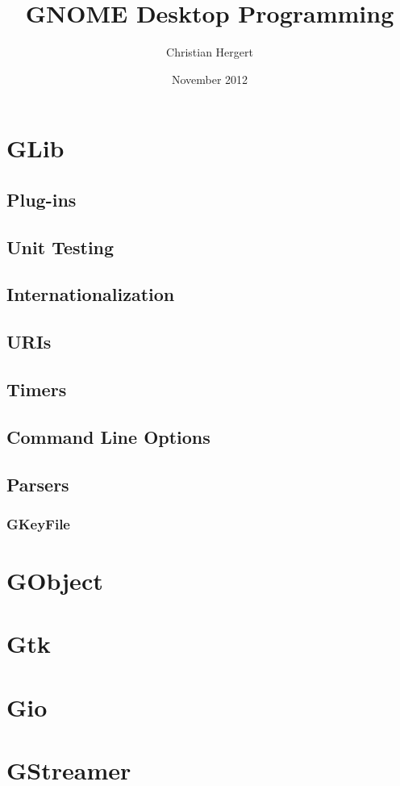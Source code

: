 

\title{
    GNOME Desktop Programming
}
\author{Christian Hergert}
\date{November 2012}

\frontmatter
\maketitle
\tableofcontents


\mainmatter
\part{GLib}










\chapter{Plug-ins}


\chapter{Unit Testing}
\chapter{Internationalization}
\chapter{URIs}
\chapter{Timers}
\chapter{Command Line Options}
\chapter{Parsers}
\section{GKeyFile}
\part{GObject}
\part{Gtk}
\part{Gio}
\part{GStreamer}
\appendix

